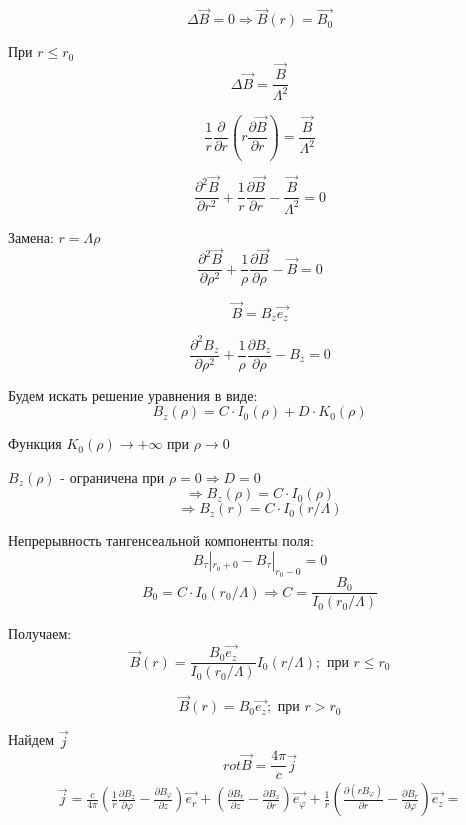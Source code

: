 \documentclass[12pt]{article}
\begin{document}
\begin{large}
\[
    \Delta \overrightarrow{B} = 0  \Rightarrow \overrightarrow{B}(r) = \overrightarrow{B_0}
\]
\par При $r \leqslant r_0$
\[
   \Delta \overrightarrow{B} = \frac{\overrightarrow{B}}{\Lambda^2}
\]
\par
\[
    \frac{1}{r} \frac{\partial}{\partial r} \left( r \frac{\partial \overrightarrow{B}}{\partial r} \right) = \frac{\overrightarrow{B}}{\Lambda^2}
\]
\par
\[
    \frac{\partial^2 \overrightarrow{B}}{\partial r^2} + \frac{1}{r} \frac{\partial \overrightarrow{B}}{\partial r} - \frac{\overrightarrow{B}}{\Lambda^2} = 0
\]
\par Замена: $r = \Lambda \rho$
\[
   \frac{\partial^2 \overrightarrow{B}}{\partial \rho^2} + \frac{1}{\rho} \frac{\partial \overrightarrow{B}}{\partial \rho} - \overrightarrow{B} = 0
\]
\par
\[
    \overrightarrow{B} = B_z \overrightarrow{e_z}
\]
\par
\[
    \frac{\partial^2 B_z}{\partial \rho^2} + \frac{1}{\rho} \frac{\partial B_z}{\partial \rho} - B_z = 0
\]
\par Будем искать решение уравнения в виде:
\[
   B_z(\rho) = C \cdot I_0(\rho) + D \cdot K_0(\rho)
\]
\par Функция $K_0(\rho) \rightarrow +\infty$ при $\rho \rightarrow 0$
\par $B_z(\rho)$ - ограничена при $\rho = 0 \Rightarrow D = 0$
\[
    \Rightarrow B_z(\rho) = C \cdot I_0(\rho)
\]
\[
    \Rightarrow B_z(r) = C \cdot I_0(r/\Lambda)
\]
\par Непрерывность тангенсеальной компоненты поля:
\[
    B_{\tau}|_{r_0 + 0} - B_{\tau}|_{r_0 - 0} = 0
\]
\[
    B_0 = C \cdot I_0(r_0/\Lambda) \Rightarrow C = \frac{B_0}{I_0(r_0/\Lambda)}
\]
\par Получаем:
\[
    \overrightarrow{B}(r) = \frac{B_0 \overrightarrow{e_z}}{I_0(r_0/\Lambda)} I_0(r/\Lambda); \text{ при } r \leqslant r_0
\]
\par
\[
    \overrightarrow{B}(r) = B_0 \overrightarrow{e_z}; \text{ при } r > r_0
\]
\par Найдем $\vec{j}$
\[
    rot \overrightarrow{B} = \frac{4\pi}{c} \vec{j}
\]
\begin{multline*}
    \vec{j} = \frac{c}{4\pi} \left( \frac{1}{r} \frac{\partial B_z}{\partial \varphi} - \frac{\partial B_\varphi}{\partial z} \right) \overrightarrow{e_r} + \left( \frac{\partial B_r}{\partial z} - \frac{\partial B_z}{\partial r} \right) \overrightarrow{e_\varphi} + \frac{1}{r} \left( \frac{\partial(rB_\varphi)}{\partial r} - \frac{\partial B_r}{\partial \varphi} \right) \overrightarrow{e_z} =

\end{multline*}
\end{large}
\end{document}
